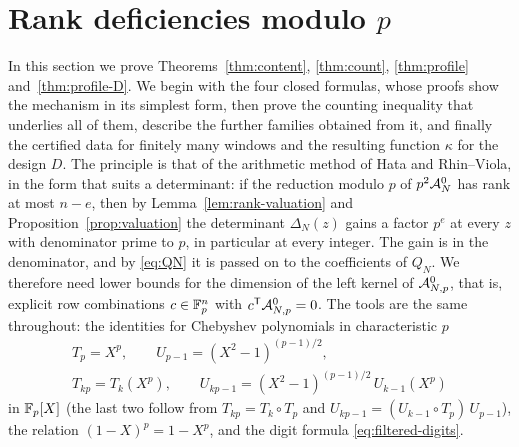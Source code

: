 \section{Rank deficiencies modulo $p$}\label{sec:content}

In this section we prove Theorems~\ref{thm:content}, \ref{thm:count}, \ref{thm:profile}
and~\ref{thm:profile-D}. We begin with the four closed formulas, whose proofs show the mechanism in its
simplest form, then prove the counting inequality that underlies all of them, describe the further
families obtained from it, and finally the certified data for finitely many windows and the resulting
function $\kappa$ for the design $D$. The principle is that of the arithmetic method of Hata
and Rhin--Viola, in the form that suits a determinant: if the reduction modulo $p$ of $p^2\mathcal A^0_N$ has
rank at most $n-e$, then by Lemma~\ref{lem:rank-valuation} and Proposition~\ref{prop:valuation} the
determinant $\Delta_N(z)$ gains a factor $p^e$ at every $z$ with denominator prime to $p$, in
particular at every integer. The gain is in the denominator, and by \eqref{eq:QN} it is passed on to
the coefficients of $Q_N$. We therefore need lower bounds for the dimension of the left kernel of
$\mathcal A^0_{N,p}$, that is, explicit row combinations $c\in\mathbb F_p^n$ with $c^{\mathsf T}\mathcal A^0_{N,p}=0$. The
tools are the same throughout: the identities for Chebyshev polynomials in characteristic $p$
\begin{equation}\label{eq:cheb-p}
 \begin{gathered}
 T_p=X^p,\qquad U_{p-1}=(X^2-1)^{(p-1)/2},\\
 T_{kp}=T_k(X^p),\qquad U_{kp-1}=(X^2-1)^{(p-1)/2}\,U_{k-1}(X^p)
 \end{gathered}
\end{equation}
in $\mathbb F_p[X]$ (the last two follow from $T_{kp}=T_k\circ T_p$ and $U_{kp-1}=(U_{k-1}\circ T_p)\,U_{p-1}$), the relation
$(1-X)^p=1-X^p$, and the digit formula \eqref{eq:filtered-digits}.

